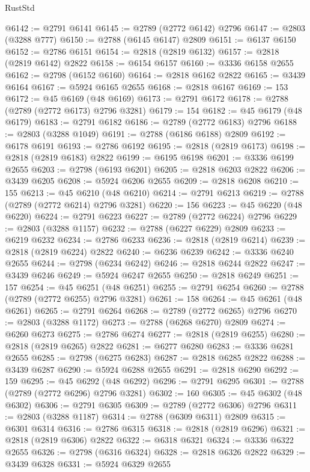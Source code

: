 \begin{lexlean}{RustStd}
\begin{coremodule}
@6142 := @2791 @6141
@6145 := @2789 (@2772 @6142) @2796
@6147 := @2803 (@3288 @777)
@6150 := @2788 (@6145 @6147) @2809
@6151 := @6137 @6150
@6152 := @2786 @6151
@6154 := @2818 (@2819 @6132)
@6157 := @2818 (@2819 @6142) @2822
@6158 := @6154 @6157
@6160 := @3336 @6158 @2655
@6162 := @2798 (@6152 @6160)
@6164 := @2818 @6162 @2822
@6165 := @3439 @6164
@6167 := @5924 @6165 @2655
@6168 := @2818 @6167
@6169 := 153
@6172 := @45 @6169 (@48 @6169)
@6173 := @2791 @6172
@6178 := @2788 (@2789 (@2772 @6173) @2796 @3281)
@6179 := 154
@6182 := @45 @6179 (@48 @6179)
@6183 := @2791 @6182
@6186 := @2789 (@2772 @6183) @2796
@6188 := @2803 (@3288 @1049)
@6191 := @2788 (@6186 @6188) @2809
@6192 := @6178 @6191
@6193 := @2786 @6192
@6195 := @2818 (@2819 @6173)
@6198 := @2818 (@2819 @6183) @2822
@6199 := @6195 @6198
@6201 := @3336 @6199 @2655
@6203 := @2798 (@6193 @6201)
@6205 := @2818 @6203 @2822
@6206 := @3439 @6205
@6208 := @5924 @6206 @2655
@6209 := @2818 @6208
@6210 := 155
@6213 := @45 @6210 (@48 @6210)
@6214 := @2791 @6213
@6219 := @2788 (@2789 (@2772 @6214) @2796 @3281)
@6220 := 156
@6223 := @45 @6220 (@48 @6220)
@6224 := @2791 @6223
@6227 := @2789 (@2772 @6224) @2796
@6229 := @2803 (@3288 @1157)
@6232 := @2788 (@6227 @6229) @2809
@6233 := @6219 @6232
@6234 := @2786 @6233
@6236 := @2818 (@2819 @6214)
@6239 := @2818 (@2819 @6224) @2822
@6240 := @6236 @6239
@6242 := @3336 @6240 @2655
@6244 := @2798 (@6234 @6242)
@6246 := @2818 @6244 @2822
@6247 := @3439 @6246
@6249 := @5924 @6247 @2655
@6250 := @2818 @6249
@6251 := 157
@6254 := @45 @6251 (@48 @6251)
@6255 := @2791 @6254
@6260 := @2788 (@2789 (@2772 @6255) @2796 @3281)
@6261 := 158
@6264 := @45 @6261 (@48 @6261)
@6265 := @2791 @6264
@6268 := @2789 (@2772 @6265) @2796
@6270 := @2803 (@3288 @1172)
@6273 := @2788 (@6268 @6270) @2809
@6274 := @6260 @6273
@6275 := @2786 @6274
@6277 := @2818 (@2819 @6255)
@6280 := @2818 (@2819 @6265) @2822
@6281 := @6277 @6280
@6283 := @3336 @6281 @2655
@6285 := @2798 (@6275 @6283)
@6287 := @2818 @6285 @2822
@6288 := @3439 @6287
@6290 := @5924 @6288 @2655
@6291 := @2818 @6290
@6292 := 159
@6295 := @45 @6292 (@48 @6292)
@6296 := @2791 @6295
@6301 := @2788 (@2789 (@2772 @6296) @2796 @3281)
@6302 := 160
@6305 := @45 @6302 (@48 @6302)
@6306 := @2791 @6305
@6309 := @2789 (@2772 @6306) @2796
@6311 := @2803 (@3288 @1187)
@6314 := @2788 (@6309 @6311) @2809
@6315 := @6301 @6314
@6316 := @2786 @6315
@6318 := @2818 (@2819 @6296)
@6321 := @2818 (@2819 @6306) @2822
@6322 := @6318 @6321
@6324 := @3336 @6322 @2655
@6326 := @2798 (@6316 @6324)
@6328 := @2818 @6326 @2822
@6329 := @3439 @6328
@6331 := @5924 @6329 @2655

\end{coremodule}
\end{lexlean}

